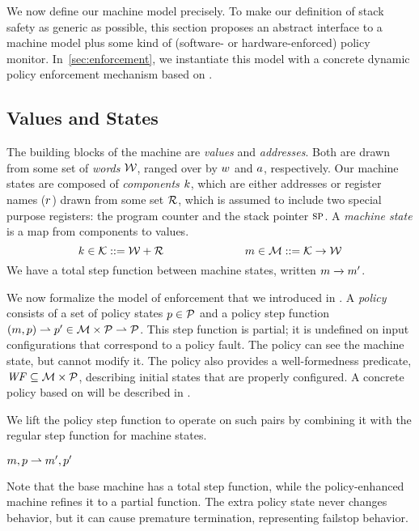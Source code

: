 \documentclass[acmsmall,review,anonymous]{acmart}\settopmatter{printfolios=true,printccs=false,printacmref=false}
\begin{document}
We now define our machine model precisely. To make our definition of stack safety
as generic as possible, this section proposes an abstract interface to a
machine model plus some kind of (software- or hardware-enforced) policy monitor.
In~\cref{sec:enforcement}, we instantiate this model with a concrete dynamic
policy enforcement mechanism based on \citet{DBLP:conf/sp/RoesslerD18}.

\subsection{Values and States}

The building blocks of the machine are {\em values} and {\em addresses}.
Both are drawn from some set of {\em words} \({\mathcal W}\), ranged over by \(w\) and
\(a\), respectively.
%
Our machine states are composed of {\em components} \(k\),
which are either addresses or register names (\(r\)) drawn from some set
\({\mathcal R}\), which is assumed to include two special purpose registers: the
program counter {\PCname} and the stack pointer \(\textsc{sp}\).
A {\em machine state} is a map from components to values.
%
    \[k \in {\mathcal K} ::= {\mathcal W} + {\mathcal R}  \hspace{1in} 
    m \in {\mathcal M} ::= {\mathcal K} \rightarrow {\mathcal W}\]
%
We have a total step function between machine states, written \(m \xrightarrow{} m'\).

We now formalize the model of enforcement that we introduced in .
A {\em policy} consists of a set of policy
states \(p \in \mathcal{P}\) and a policy step function \((m, p) \rightharpoonup p' \in
{\mathcal M} \times \mathcal{P} \rightharpoonup \mathcal{P}\). This step function is partial;
it is undefined on input configurations that correspond to a policy fault. The policy
can see the machine state, but cannot modify it. The policy also provides a
well-formedness predicate, \(\mathit{WF} \subseteq {\mathcal M} \times \mathcal{P}\), describing
initial states that are properly configured.
%
A concrete policy based on \citet{DBLP:conf/sp/RoesslerD18} will be described in
.

We lift the policy step function to operate on such pairs
by combining it with the regular step function for machine states.

            {\(m,p \overset{}{\rightharpoonup}
               m',p'\)}

\noindent
Note that the base machine has a total step function, while the policy-enhanced machine
refines it to a partial function. The extra policy state never changes behavior,
but it can cause
premature termination, representing failstop behavior.
\end{document}
